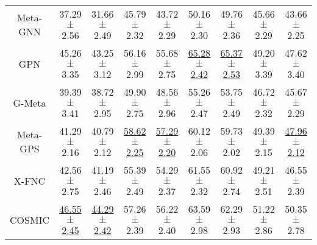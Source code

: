 \begin{table*}[ht]
{\begin{tabular}{@{}c|cccccccc@{}}
Meta-GNN                 & 37.29$\pm$2.56                        & 31.66$\pm$2.49                       & 45.79$\pm$2.32                        & 43.72$\pm$2.29                       & 50.16$\pm$2.30                       & 49.76$\pm$2.36                       & 45.66$\pm$2.29                       & 43.66$\pm$2.25                       \\
GPN                      & 45.26$\pm$3.35                  & 43.25$\pm$3.12                 & 56.16$\pm$2.99                        & 55.68$\pm$2.75                       & \underline{65.28$\pm$2.42}                 &\underline{65.37$\pm$2.53}                 & 49.20$\pm$3.39                       & 47.62$\pm$3.40                       \\
G-Meta                   & 39.39$\pm$3.41                        & 38.72$\pm$2.95                       & 49.90$\pm$2.75                        & 48.56$\pm$2.96                       & 55.26$\pm$2.47                       & 53.75$\pm$2.49                       & 46.72$\pm$2.32                       & 45.67$\pm$2.29                       \\
Meta-GPS                 & 41.29$\pm$2.16                        & 40.79$\pm$2.12                       & \underline{58.62$\pm$2.25}                        & \underline{57.29$\pm$2.20}                       & 60.12$\pm$2.06                       & 59.73$\pm$2.02                       & 49.39$\pm$2.15                       & \underline{47.96$\pm$2.12}                       \\
X-FNC                    & 42.56$\pm$2.75                        & 41.19$\pm$2.46                       & 55.39$\pm$2.49                        & 54.29$\pm$2.37                       & 61.55$\pm$2.32                       & 60.92$\pm$2.74                       & 49.21$\pm$2.51                       & 46.55$\pm$2.39                       \\ 
COSMIC                    & \underline{46.55$\pm$2.45}                        & \underline{44.29$\pm$2.42}                       & 57.26$\pm$2.39                        & 56.22$\pm$2.40                       & 63.59$\pm$2.98                       & 62.29$\pm$2.93                       & 51.22$\pm$2.86                       & 50.35$\pm$2.78                       \\

\end{tabular}}
\end{table*}
